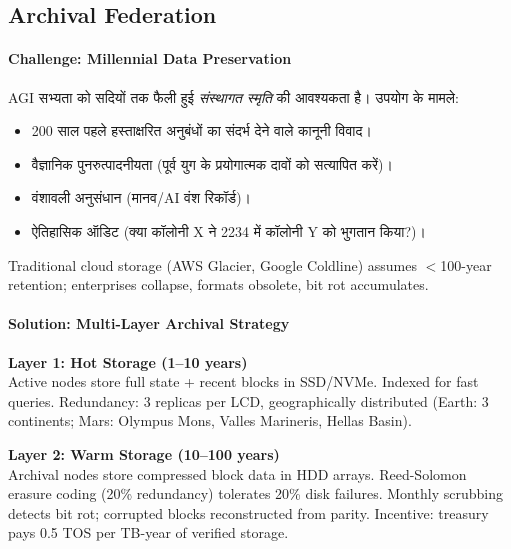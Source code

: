\documentclass[11pt]{article}
\begin{document}
\begin{itemize}[noitemsep]
\begin{itemize}[noitemsep]
\subsection{Archival Federation}

\paragraph{Challenge: Millennial Data Preservation}
AGI सभ्यता को सदियों तक फैली हुई \emph{संस्थागत स्मृति} की आवश्यकता है। उपयोग के मामले:
\begin{itemize}[noitemsep]
  \item 200 साल पहले हस्ताक्षरित अनुबंधों का संदर्भ देने वाले कानूनी विवाद।
  \item वैज्ञानिक पुनरुत्पादनीयता (पूर्व युग के प्रयोगात्मक दावों को सत्यापित करें)।
  \item वंशावली अनुसंधान (मानव/AI वंश रिकॉर्ड)।
  \item ऐतिहासिक ऑडिट (क्या कॉलोनी X ने 2234 में कॉलोनी Y को भुगतान किया?)।
\end{itemize}
Traditional cloud storage (AWS Glacier, Google Coldline) assumes $<$100-year retention; enterprises collapse, formats obsolete, bit rot accumulates.

\paragraph{Solution: Multi-Layer Archival Strategy}

\textbf{Layer 1: Hot Storage (1--10 years)}\\
Active nodes store full state + recent blocks in SSD/NVMe. Indexed for fast queries. Redundancy: 3 replicas per LCD, geographically distributed (Earth: 3 continents; Mars: Olympus Mons, Valles Marineris, Hellas Basin).

\textbf{Layer 2: Warm Storage (10--100 years)}\\
Archival nodes store compressed block data in HDD arrays. Reed-Solomon erasure coding (20\% redundancy) tolerates 20\% disk failures. Monthly scrubbing detects bit rot; corrupted blocks reconstructed from parity. Incentive: treasury pays 0.5 TOS per TB-year of verified storage.


\end{itemize}
\end{itemize}
\end{document}
